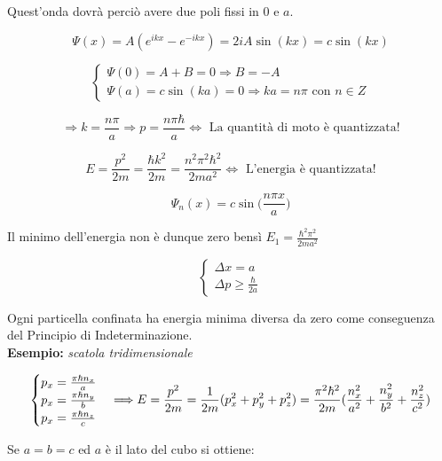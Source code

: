 Quest'onda dovrà perciò avere due poli fissi in $0$ e $a$.

$$\Psi (x) = A ( e^{i k x} - e^{- i k x} ) = 2 i A \sin(k x) = c \sin(k x) $$

\begin{equation}
\begin{cases}
	\Psi(0) = A + B = 0 \Rightarrow B = - A \\
	\Psi(a) = c \sin(k a) = 0 \Rightarrow k a = n \pi \mbox{ con } n \in Z
\end{cases}
\end{equation}

$$ \Rightarrow k = \frac{n \pi}{a} \Rightarrow p = \frac{n \pi \hbar}{a} \iff \mbox{ La quantità di moto è quantizzata!} $$

$$ E = \frac{p^2}{2m} = \frac{\hbar k^2}{2m} = \frac{n^2 \pi^2 \hbar^2}{2 m a^2} \iff \mbox{ L'energia è quantizzata!} $$

$$ \Psi_{n} (x) = c \sin \bigl( \frac{ n \pi x }{a} \bigr) $$



Il minimo dell'energia non è dunque zero bensì $E_1 = \frac{\hbar^2 \pi^2}{2 m a^2} $

\begin{equation}
\begin{cases}
	\Delta x = a \\
	\Delta p \geq \frac{\hbar}{2a}
\end{cases}
\end{equation}

Ogni particella confinata ha energia minima diversa da zero come conseguenza del Principio di Indeterminazione. \\

\textbf{Esempio:} \textit{scatola tridimensionale}

\begin{equation}
\begin{cases}
	p_x = \frac{\pi \hbar n_x}{a} \\
	p_x = \frac{\pi \hbar n_y}{b} \\
	p_x = \frac{\pi \hbar n_z}{c}
\end{cases}
\Longrightarrow E = \frac{p^2}{2m} = \frac{1}{2m} ( p_x^2 + p_y^2 + p_z^2 ) \\
= \frac{\pi^2 \hbar^2}{2m} (\frac{n_x^2}{a^2} + \frac{n_y^2}{b^2} + \frac{n_z^2}{c^2} )
\end{equation}

Se $a=b=c$ ed $a$ è il lato del cubo si ottiene:

